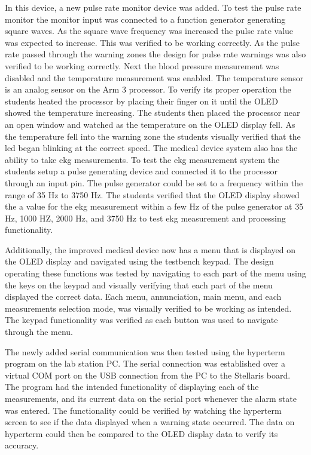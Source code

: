 \documentclass[12pt]{article} %
\begin{document}
    In this device, a new pulse rate monitor device was added. To test the
    pulse rate monitor  the monitor input was connected to a function generator
    generating square waves. As the square wave frequency was increased the
    pulse rate value was expected to increase. This was verified to be working
    correctly. As the pulse rate passed through the warning zones the design
    for pulse rate warnings was also verified to be working correctly.
Next the blood pressure measurement was disabled and the temperature measurement was enabled.
The temperature sensor is an analog sensor on the Arm 3 processor. To verify its proper operation
the students heated the processor by placing their finger on it until the OLED showed the temperature increasing.
The students then placed the processor near an open window and watched as the temperature on the OLED display fell.
As the temperature fell into the warning zone the students visually verified that the led began blinking at the correct speed.
The medical device system also has the ability to take ekg measurements. To test the ekg measurement system the students setup
a pulse generating device and connected it to the processor through an input pin. The pulse generator could be set to a frequency 
within the range of 35 Hz to 3750 Hz. The students verified that the OLED display showed the a value for the ekg measurement within a few Hz
of the pulse generator at 35 Hz, 1000 HZ, 2000 Hz, and 3750 Hz to test ekg measurement and processing functionality.
    
    Additionally, the improved medical device now has a menu that is displayed
    on the OLED display and navigated using the testbench keypad. The design
    operating these functions was tested by navigating to each part of the menu
    using the keys on the keypad and visually verifying that each part of the
    menu displayed the correct data. Each menu, annunciation, main menu, and
    each measurements selection mode, was visually verified to be working as
    intended. The keypad functionality was verified as each button was used to
    navigate through the menu.
    
    The newly added serial communication was then tested using the hyperterm
    program on the lab station PC. The serial connection was established over a
    virtual COM port on the USB connection from the PC to the Stellaris board.
    The program had the intended functionality of displaying each of the
    measurements, and its current data on the serial port whenever the alarm
    state was entered. The functionality could be verified by watching the
    hyperterm screen to see if the data displayed when a warning state occurred.
    The data on hyperterm could then be compared to the OLED display data to
    verify its accuracy. 
    
\end{document}
